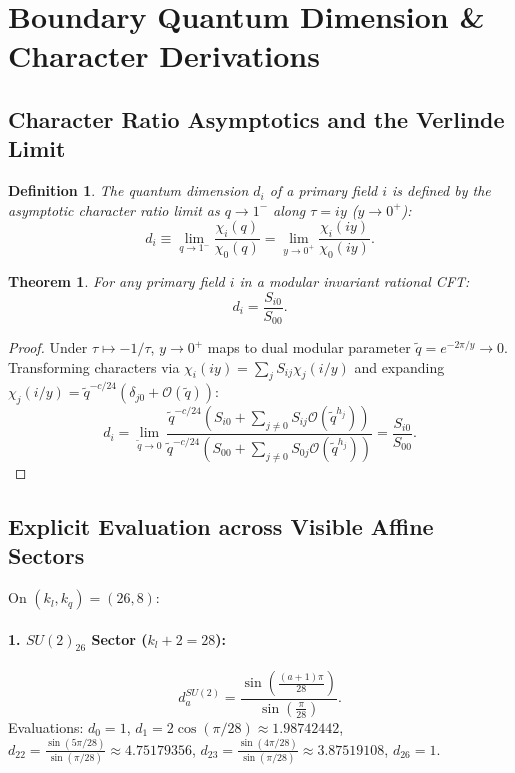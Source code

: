 \documentclass[11pt,letterpaper]{article}
\theoremstyle{plain}
\newtheorem{theorem}{Theorem}
\newtheorem{definition}{Definition}
\begin{document}
\section{Boundary Quantum Dimension \& Character Derivations}
\label{sec:quantum_dimension_derivation}
\label{app:boundary-measure-quantum-dimensions}

\subsection{Character Ratio Asymptotics and the Verlinde Limit}
\begin{definition}
The quantum dimension $d_i$ of a primary field $i$ is defined by the asymptotic character ratio limit as $q \to 1^-$ along $\tau = i y$ ($y \to 0^+$):
\begin{equation}
d_i \equiv \lim_{q \to 1^-} \frac{\chi_i(q)}{\chi_0(q)} = \lim_{y \to 0^+} \frac{\chi_i(i y)}{\chi_0(i y)}.
\end{equation}
\end{definition}

\begin{theorem}
For any primary field $i$ in a modular invariant rational CFT:
\begin{equation}
d_i = \frac{S_{i0}}{S_{00}}.
\end{equation}
\end{theorem}

\begin{proof}
Under $\tau \mapsto -1/\tau$, $y \to 0^+$ maps to dual modular parameter $\tilde{q} = e^{-2\pi/y} \to 0$. Transforming characters via $\chi_i(i y) = \sum_{j} S_{ij} \chi_j(i / y)$ and expanding $\chi_j(i/y) = \tilde{q}^{-c/24} (\delta_{j0} + \mathcal{O}(\tilde{q}))$:
\begin{equation}
d_i = \lim_{\tilde{q} \to 0} \frac{\tilde{q}^{-c/24} \left( S_{i0} + \sum_{j \neq 0} S_{ij} \mathcal{O}(\tilde{q}^{h_j}) \right)}{\tilde{q}^{-c/24} \left( S_{00} + \sum_{j \neq 0} S_{0j} \mathcal{O}(\tilde{q}^{h_j}) \right)} = \frac{S_{i0}}{S_{00}}.
\end{equation}
\end{proof}

\subsection{Explicit Evaluation across Visible Affine Sectors}
On $(k_l, k_q) = (26, 8)$:

\paragraph{1. $SU(2)_{26}$ Sector ($k_l + 2 = 28$):}
\begin{equation}
d_a^{SU(2)} = \frac{\sin\left( \frac{(a+1)\pi}{28} \right)}{\sin\left( \frac{\pi}{28} \right)}.
\end{equation}
Evaluations: $d_0 = 1$, $d_1 = 2 \cos(\pi/28) \approx 1.98742442$, $d_{22} = \frac{\sin(5\pi/28)}{\sin(\pi/28)} \approx 4.75179356$, $d_{23} = \frac{\sin(4\pi/28)}{\sin(\pi/28)} \approx 3.87519108$, $d_{26} = 1$.
\end{document}
